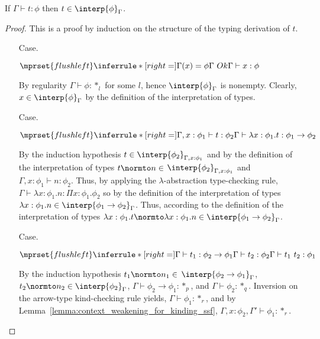 \begin{thm}
  If $\Gamma \vdash t:\phi$ then $t \in \interp{\phi}_\Gamma$.
  \label{thm:soundness_ssf}
\end{thm}
\begin{proof}
  This is a proof by induction on the structure of the typing derivation of $t$.

\begin{itemize}
\item[Case.]\ \\
  \begin{center}
    \begin{math}
      $$\mprset{flushleft}
      \inferrule* [right=] {
        \Gamma(x) = \phi
        \\
        \Gamma\ Ok
      }{\Gamma \vdash x:\phi}
    \end{math}
  \end{center}
  By regularity $\Gamma \vdash \phi:*_l$ for some $l$, hence $\interp{\phi}_\Gamma$ is nonempty.
  Clearly, $x \in \interp{\phi}_\Gamma$ by the definition of the interpretation of types.
  
\item[Case.]\ \\
  \begin{center}
    \begin{math}
      $$\mprset{flushleft}
      \inferrule* [right=] {
        \Gamma,x:\phi_1 \vdash t:\phi_2
      }{\Gamma \vdash \lambda x:\phi_1.t : \phi_1 \rightarrow \phi_2}
    \end{math}
  \end{center}
  By the induction hypothesis $t \in
  \interp{\phi_2}_{\Gamma,x:\phi_1}$ and by the definition of the
  interpretation of types $t \normto n \in $ 
  $\interp{\phi_2}_{\Gamma,x:\phi_1}$ and $\Gamma, x:\phi_1 \vdash
  n:\phi_2$.  Thus, by applying the $\lambda$-abstraction type-checking
  rule, $\Gamma \vdash \lambda x:\phi_1.n:\Pi x:\phi_1.\phi_2$ so 
  by the definition of the interpretation of types $\lambda x:\phi_1.n
  \in \interp{\phi_1 \rightarrow \phi_2}_\Gamma$.  Thus, according to the
  definition of the interpretation of types $\lambda x:\phi_1.t
  \normto \lambda x:\phi_1.n \in \interp{\phi_1 \rightarrow \phi_2}_\Gamma$.

\item[Case.]\ \\
  \begin{center}
    \begin{math}
      $$\mprset{flushleft}
      \inferrule* [right=] {
        \Gamma \vdash t_1 : \phi_2 \rightarrow \phi_1 
        \\
        \Gamma \vdash t_2 : \phi_2
      }{\Gamma \vdash t_1\ t_2 : \phi_1}
    \end{math}
  \end{center}
  By the induction hypothesis $t_1 \normto n_1 \in $
  $\interp{\phi_2 \rightarrow \phi_1}_\Gamma$,
  $t_2 \normto n_2 \in \interp{\phi_2}_\Gamma$, $\Gamma \vdash \phi_2 \rightarrow \phi_1:*_p$, 
  and $\Gamma \vdash \phi_2:*_q$.  Inversion on the arrow-type kind-checking rule yields, 
  $\Gamma \vdash \phi_1:*_r$, and by
  Lemma~\ref{lemma:context_weakening_for_kinding_ssf}, 
  $\Gamma,x:\phi_2,\Gamma' \vdash \phi_1:*_r$.


\end{itemize}
\end{proof}
